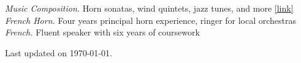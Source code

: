 \documentclass[margin,11pt]{res}
\begin{document}
\begin{resume}
\textit{Music Composition.} Horn sonatas, wind quintets, jazz tunes, and more \href{https://jeffjar.me/music.html}{[link]} \\
\textit{French Horn.} Four years principal horn experience, ringer for local orchestras \\
\textit{French.} Fluent speaker with six years of coursework

\end{resume}

\vfill\hfill{\scriptsize Last updated on \today.}
\end{document}
